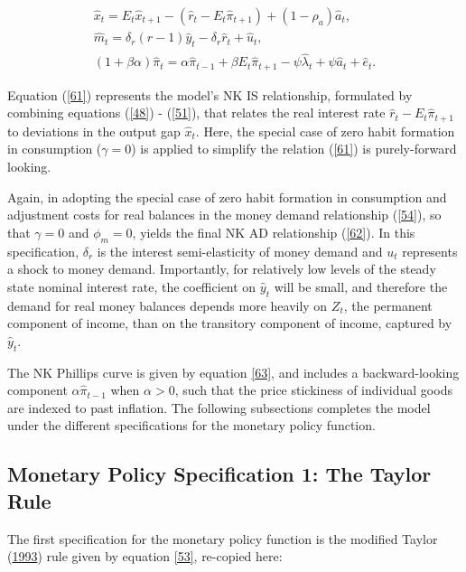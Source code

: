 \documentclass[11pt,preprint, authoryear]{elsarticle}
\numberwithin{equation}{section}
\numberwithin{figure}{section}
\numberwithin{table}{section}
\begin{document}
\begin{align}
\hat{x}_t = E_t \hat{x}_{t+1} - (\hat{r}_t - E_t \hat{\pi}_{t+1}) + (1- \rho_a)\hat{a}_t, \label{61} \\
\hat{m}_t = \delta_r (r-1)\hat{y}_t - \delta_r \hat{r}_t + \hat{u}_t,   \label{62} \\
(1+\beta \alpha) \hat{\pi}_t = \alpha \hat{\pi}_{t-1} + \beta E_t \hat{\pi}_{t+1} - \psi \hat{\lambda}_t + \psi \hat{a}_t + \hat{e}_t \label{63}.
\end{align}

Equation (\ref{61}) represents the model's NK IS relationship,
formulated by combining equations (\ref{48}) - (\ref{51}), that relates
the real interest rate \(\hat{r}_t - E_t \hat{\pi}_{t+1}\) to deviations
in the output gap \(\hat{x}_t\). Here, the special case of zero habit
formation in consumption (\(\gamma=0\)) is applied to simplify the
relation (\ref{61}) is purely-forward looking.

Again, in adopting the special case of zero habit formation in
consumption and adjustment costs for real balances in the money demand
relationship (\ref{54}), so that \(\gamma=0\) and \(\phi_m=0\), yields
the final NK AD relationship (\ref{62}). In this specification,
\(\delta_r\) is the interest semi-elasticity of money demand and \(u_t\)
represents a shock to money demand. Importantly, for relatively low
levels of the steady state nominal interest rate, the coefficient on
\(\hat{y}_t\) will be small, and therefore the demand for real money
balances depends more heavily on \(Z_t\), the permanent component of
income, than on the transitory component of income, captured by
\(\hat{y}_t\).

The NK Phillips curve is given by equation \ref{63}, and includes a
backward-looking component \(\alpha \hat{\pi}_{t-1}\) when
\(\alpha > 0\), such that the price stickiness of individual goods are
indexed to past inflation. The following subsections completes the model
under the different specifications for the monetary policy function.

\hypertarget{monetary-policy-specification-1-the-taylor-rule}{%
\subsection{Monetary Policy Specification 1: The Taylor
Rule}\label{monetary-policy-specification-1-the-taylor-rule}}

The first specification for the monetary policy function is the modified
Taylor (\protect\hyperlink{ref-taylor1993}{1993}) rule given by equation
\ref{53}, re-copied here:
\end{document}

